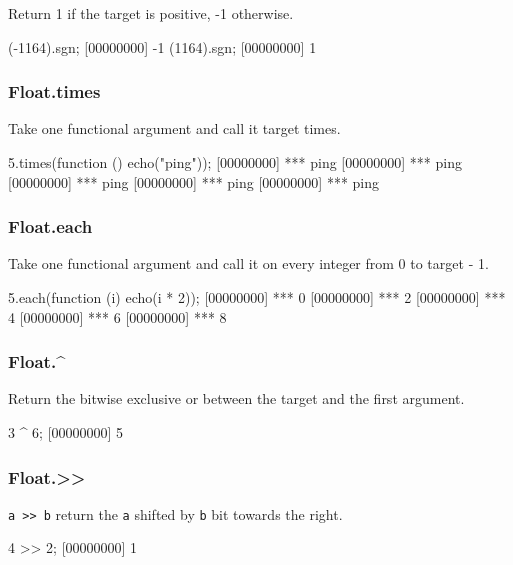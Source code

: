Return 1 if the target is positive, -1 otherwise.

\begin{urbiscript}
(-1164).sgn;
[00000000] -1
(1164).sgn;
[00000000] 1
\end{urbiscript}

\subsubsection{Float.times}

Take one functional argument and call it target times.

\begin{urbiscript}
5.times(function () { echo("ping")});
[00000000] *** ping
[00000000] *** ping
[00000000] *** ping
[00000000] *** ping
[00000000] *** ping
\end{urbiscript}

\subsubsection{Float.each}

Take one functional argument and call it on every integer from 0 to
target - 1.

\begin{urbiscript}
5.each(function (i) { echo(i * 2)});
[00000000] *** 0
[00000000] *** 2
[00000000] *** 4
[00000000] *** 6
[00000000] *** 8
\end{urbiscript}

\subsubsection{Float.\^{}}

Return the bitwise exclusive or between the target and the first argument.

\begin{urbiscript}
3 ^ 6;
[00000000] 5
\end{urbiscript}

\subsubsection{Float.\textgreater\textgreater}

\lstinline|a >> b| return the \lstinline|a| shifted by \lstinline|b|
bit towards the right.

\begin{urbiscript}
4 >> 2;
[00000000] 1
\end{urbiscript}


